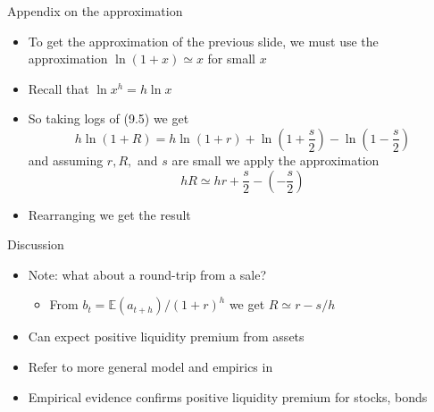 \documentclass[english,10pt
,aspectratio=169
]{beamer}
\begin{document}
\begin{frame}{Appendix on the approximation}
	\begin{itemize}
		\item To get the approximation of the previous slide, we must use the approximation $\ln (1+x) \simeq x$ for small $x$
		\item Recall that $\ln x^h = h \ln x$
		\item So taking logs of (9.5) we get
		\[
		h \ln (1+R) = h\ln (1+r) + \ln(1+\frac{s}{2}) - \ln(1-\frac{s}{2}) 
		\]
		and assuming $r, R,$ and $s$ are small we apply the approximation
		\[
		hR \simeq hr+\frac{s}{2}- \left(-\frac{s}{2}\right)
		\]
		\item Rearranging we get the result
	\end{itemize}
\end{frame}


\begin{frame}{Discussion}
	\begin{itemize}
		\item Note: what about a round-trip from a sale?
		\begin{itemize}
			\item From $b_t=\mathbb{E}(a_{t+h})/(1+r)^h$ we get $R \simeq r-s/h$
		\end{itemize}
		\pause
		\pause[4]
		\item Can expect positive liquidity premium from assets 
		\item Refer to more general model and empirics in \citet*{bongaerts_derivative_2011}
		\item Empirical evidence confirms positive liquidity premium for stocks, bonds
	\end{itemize}
\end{frame}
\end{document}
